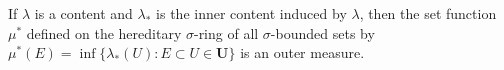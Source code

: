 If $\lambda$ is a content and $\lambda_*$ is the inner content induced by $\lambda$, then the set function $\mu^*$ defined on the hereditary $\sigma$-ring of all $\sigma$-bounded sets by $\mu^*(E) = \inf \{\lambda_*(U): E \subset U \in \mathbf{U}\}$ is an outer measure.

